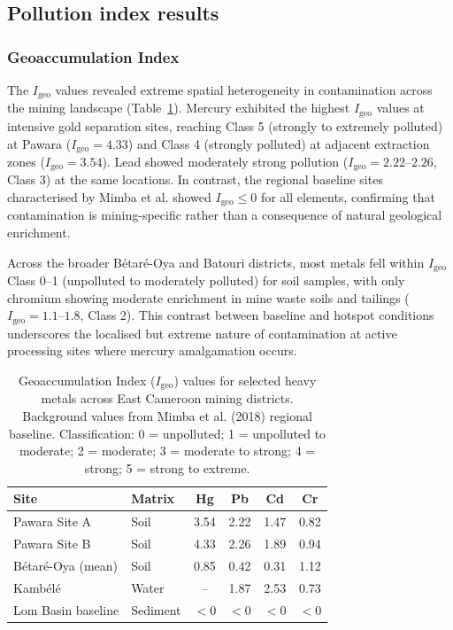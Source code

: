\documentclass[preprint,12pt,number]{elsarticle}
\begin{document}
\subsection{Pollution index results}

\subsubsection{Geoaccumulation Index}

The $I_\text{geo}$ values revealed extreme spatial heterogeneity in contamination across the mining landscape (Table~\ref{tab:igeo}). Mercury exhibited the highest $I_\text{geo}$ values at intensive gold separation sites, reaching Class 5 (strongly to extremely polluted) at Pawara ($I_\text{geo} = 4.33$) and Class 4 (strongly polluted) at adjacent extraction zones ($I_\text{geo} = 3.54$). Lead showed moderately strong pollution ($I_\text{geo} = 2.22$--$2.26$, Class 3) at the same locations. In contrast, the regional baseline sites characterised by Mimba et al. \cite{Mimba2018} showed $I_\text{geo} \leq 0$ for all elements, confirming that contamination is mining-specific rather than a consequence of natural geological enrichment.

Across the broader B\'{e}tar\'{e}-Oya and Batouri districts, most metals fell within $I_\text{geo}$ Class 0--1 (unpolluted to moderately polluted) for soil samples, with only chromium showing moderate enrichment in mine waste soils and tailings ($I_\text{geo} = 1.1$--$1.8$, Class 2). This contrast between baseline and hotspot conditions underscores the localised but extreme nature of contamination at active processing sites where mercury amalgamation occurs.

\begin{table}[h!]
\centering
\caption{Geoaccumulation Index ($I_\text{geo}$) values for selected heavy metals across East Cameroon mining districts. Background values from Mimba et al. (2018) regional baseline. Classification: 0 = unpolluted; 1 = unpolluted to moderate; 2 = moderate; 3 = moderate to strong; 4 = strong; 5 = strong to extreme.}
\label{tab:igeo}
\small
\begin{tabular}{llcccc}
\toprule
Site & Matrix & Hg & Pb & Cd & Cr \\
\midrule
Pawara Site A & Soil & 3.54 & 2.22 & 1.47 & 0.82 \\
Pawara Site B & Soil & 4.33 & 2.26 & 1.89 & 0.94 \\
B\'{e}tar\'{e}-Oya (mean) & Soil & 0.85 & 0.42 & 0.31 & 1.12 \\
Kamb\'{e}l\'{e} & Water & -- & 1.87 & 2.53 & 0.73 \\
Lom Basin baseline & Sediment & $<$0 & $<$0 & $<$0 & $<$0 \\
\bottomrule
\end{tabular}
\end{table}
\end{document}
